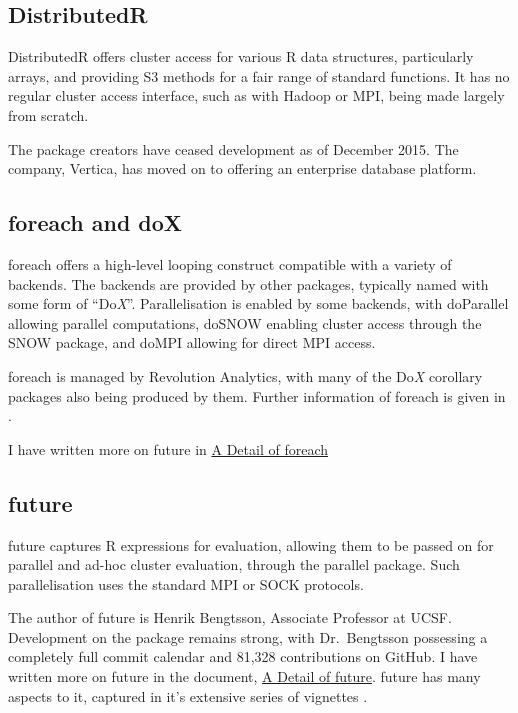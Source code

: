 \hypertarget{sec:distributedr}{%
    \subsection{DistributedR}\label{sec:distributedr}}

DistributedR offers cluster access for various R data structures,
particularly arrays, and providing S3 methods for a fair range of
standard functions. It has no regular cluster access interface, such as
with Hadoop or MPI, being made largely from scratch.

The package creators have ceased development as of December 2015. The
company, Vertica, has moved on to offering an enterprise database
platform\cite{vertica:_distr}.

\hypertarget{sec:foreach-doc}{%
    \subsection{foreach and doX}\label{sec:foreach-doc}}

foreach offers a high-level looping construct compatible with a variety
of backends\cite{microsoft20}. The backends are provided by other
packages, typically named with some form of ``Do\emph{X}''.
Parallelisation is enabled by some backends, with doParallel allowing
parallel computations\cite{corporation19}, doSNOW enabling cluster
access through the SNOW package\cite{dosnow19}, and doMPI allowing for
direct MPI access\cite{weston17}.

foreach is managed by Revolution Analytics, with many of the Do\emph{X}
corollary packages also being produced by them. Further information of
foreach is given in \cite{weston19:_using}.

I have written more on future in \href{review-foreach.html}{A Detail of
    foreach}

\hypertarget{sec:future-furrr}{%
    \subsection{future}\label{sec:future-furrr}}

future captures R expressions for evaluation, allowing them to be passed
on for parallel and ad-hoc cluster evaluation, through the parallel
package\cite{bengtsson20}. Such parallelisation uses the standard MPI or
SOCK protocols.

The author of future is Henrik Bengtsson, Associate Professor at UCSF.
Development on the package remains strong, with Dr.~Bengtsson possessing
a completely full commit calendar and 81,328 contributions on GitHub. I
have written more on future in the document, \href{review-future.html}{A
    Detail of future}. future has many aspects to it, captured in it's
extensive series of vignettes\cite{bengtsson20:_futur_r}\cite{bengtsson20:_futur_r2}
\cite{bengtsson20:_futur_r3}\cite{bengtsson20:_futur_r4}\cite{bengtsson20:_futur_r5}\cite{bengtsson20:_futur_r6}.

